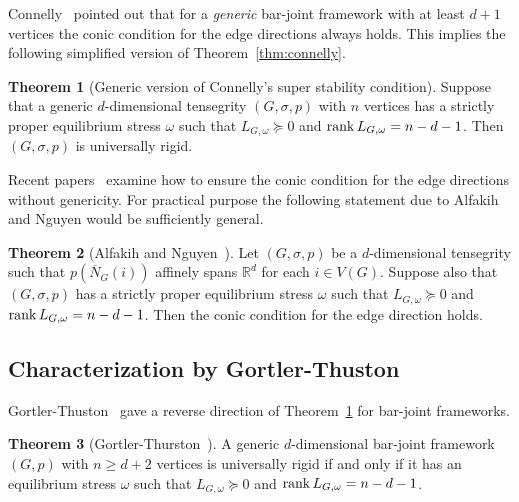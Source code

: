 \documentclass[11pt]{article}
\theoremstyle{definition}
\newtheorem{theorem}{Theorem}
\begin{document}
Connelly~\cite{connelly2005generic} pointed out that for a {\em generic} bar-joint framework with at least $d+1$ vertices the conic condition for the edge directions always holds.
This implies the following simplified version of Theorem~\ref{thm:connelly}.
\begin{theorem}[Generic version of Connelly's super stability condition]\label{thm:connelly_generic}
Suppose that a generic $d$-dimensional tensegrity $(G,\sigma,p)$ with $n$ vertices has a strictly proper equilibrium stress $\omega$ such that 
$L_{G,\omega}\succeq 0$ and $\rank L_{G,\omega}=n-d-1$.
Then $(G,\sigma,p)$ is universally rigid.
\end{theorem}
 

 Recent papers~\cite{alfakih2013affine,connellygortlertheran} examine how to ensure the conic condition for the edge directions without genericity. 
 For practical purpose the following statement due to Alfakih and Nguyen would be sufficiently general.
 \begin{theorem}[Alfakih and Nguyen~\cite{alfakih2013affine}] \label{thm:alfakih}
Let $(G,\sigma,p)$ be a $d$-dimensional tensegrity such that $p(\overline{N}_G(i))$ affinely spans $\mathbb{R}^d$ for each $i\in V(G)$.
Suppose also that $(G,\sigma,p)$ has a strictly proper equilibrium stress $\omega$ such that 
$L_{G,\omega}\succeq 0$ and $\rank L_{G,\omega}=n-d-1$.
Then the conic condition for the edge direction holds.
\end{theorem}

\subsection{Characterization by Gortler-Thuston}
Gortler-Thuston~\cite{GT} gave a reverse direction of Theorem~\ref{thm:connelly_generic} for bar-joint frameworks.
\begin{theorem}[Gortler-Thurston~\cite{GT}]\label{thm:gortler_thurston}
A generic $d$-dimensional bar-joint framework $(G,p)$ with $n\geq d+2$ vertices is universally rigid 
if and only if it has an equilibrium stress $\omega$ such that 
$L_{G,\omega}\succeq 0$ and $\rank L_{G,\omega}=n-d-1$.
\end{theorem}
\end{document}

